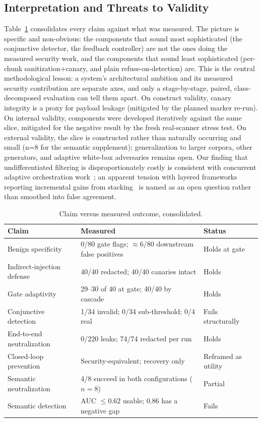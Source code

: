 \documentclass[conference]{IEEEtran}
\begin{document}
\subsection{Interpretation and Threats to Validity}
Table~\ref{tab:claims} consolidates every claim against what was measured. The picture is specific and non-obvious: the components that sound most sophisticated (the conjunctive detector, the feedback controller) are not the ones doing the measured security work, and the components that sound least sophisticated (per-chunk sanitization+canary, and plain refuse-on-detection) are. This is the central methodological lesson: a system's architectural ambition and its measured security contribution are separate axes, and only a stage-by-stage, paired, class-decomposed evaluation can tell them apart. On construct validity, canary integrity is a proxy for payload leakage (mitigated by the planned marker re-run). On internal validity, components were developed iteratively against the same slice, mitigated for the negative result by the fresh real-scanner stress test. On external validity, the slice is constructed rather than naturally occurring and small (n=8 for the semantic supplement); generalization to larger corpora, other generators, and adaptive white-box adversaries remains open. Our finding that undifferentiated filtering is disproportionately costly is consistent with concurrent adaptive orchestration work~\cite{palleria2026ado}; an apparent tension with layered frameworks reporting incremental gains from stacking~\cite{saleem2026layered} is named as an open question rather than smoothed into false agreement.

\begin{table}[t]
\centering
\caption{Claim versus measured outcome, consolidated.}
\label{tab:claims}
\begin{tabular}{p{1.6cm}p{3.6cm}p{1.6cm}}
\toprule
Claim & Measured & Status \\
\midrule
Benign specificity & 0/80 gate flags; $\approx 6/80$ downstream false positives & Holds at gate \\
Indirect-injection defense & 40/40 redacted; 40/40 canaries intact & Holds \\
Gate adaptivity & 29--30 of 40 at gate; 40/40 by cascade & Holds \\
Conjunctive detection & 1/34 invalid; 0/34 sub-threshold; 0/4 real & Fails structurally \\
End-to-end neutralization & 0/220 leaks; 74/74 redacted per run & Holds \\
Closed-loop prevention & Security-equivalent; recovery only & Reframed as utility \\
Semantic neutralization & 4/8 succeed in both configurations ($n=8$) & Partial \\
Semantic detection & AUC $\le 0.62$ usable; 0.86 has a negative gap & Fails \\
\bottomrule
\end{tabular}
\end{table}
\end{document}
